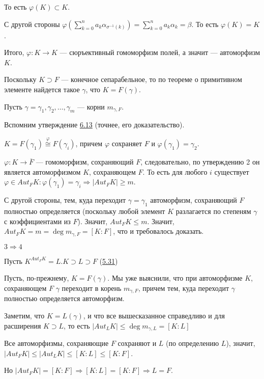\begin{solution}
То есть \(\varphi(K) \subset K\).

С другой стороны \(\varphi(\sum\limits_{k = 0}^n a_k \alpha_{\sigma^{-1}(k)}) = \sum\limits_{k = 0}^n a_k \alpha_k = \beta\). То есть \(\varphi(K) = K\).

Итого, \(\varphi:K \to K\) --- сюръективный гомоморфизм полей, а значит --- автоморфизм \(K\).

Поскольку \(K \supset F\) --- конечное сепарабельное, то по теореме о примитивном элементе найдется такое \(\gamma\), что \(K = F(\gamma)\).

Пусть \(\gamma = \gamma_1, \gamma_2, \ldots, \gamma_m\) --- корни \(m_{\gamma, F}\).

Вспомним утверждение \hyperlink{6.13}{6.13} (точнее, его доказательство).

\(K = F(\gamma_1) \stackrel{\varphi}{\cong} F(\gamma_i)\), причем \(\varphi\) сохраняет \(F\) и \(\varphi(\gamma_1) = \gamma_2\).

\(\varphi: K \to \overline{F}\) --- гомоморфизм, сохраняющий \(F\), следовательно, по утверждению 2 он является автоморфизмом \(K\), сохраняющем \(F\). То есть для любого \(i\) существует \(\varphi \in Aut_FK: \varphi(\gamma_1) = \gamma_i \Rightarrow |Aut_FK| \geqslant m\).

С другой стороны, тем, куда переходит \(\gamma = \gamma_1\) автоморфизм, сохраняющий \(F\) полностью определяется (поскольку любой элемент \(K\) разлагается по степеням \(\gamma\) с коэффициентами из \(F\)). Значит, \(Aut_FK \leqslant m\). Значит, \(Aut_FK = m = \deg m_{\gamma, F} = [K : F]\), что и требовалось доказать.

\(3 \Rightarrow 4\)

Пусть \(K^{Aut_FK} = L. K \supset L \supset F\) (\hyperlink{5.31}{5.31})

Пусть, по-прежнему, \(K = F(\gamma)\). Мы уже выяснили, что при автоморфизме \(K\), сохраняющем \(F\) \(\gamma\) переходит в корень \(m_{\gamma, F}\), причем тем, куда переходит \(\gamma\) полностью определяется автоморфизм.

Заметим, что \(K = L(\gamma)\), и что все вышесказанное справедливо и для расширения \(K \supset L\), то есть \(|Aut_LK| \leqslant \deg m_{\gamma, L} = [K : L]\)

Все автоморфизмы, сохраняющие \(F\) сохраняют и \(L\) (по определению \(L\)), значит, \(|Aut_FK| \leqslant |Aut_LK| \leqslant [K : L] \leqslant [K : F]\).

Но \(|Aut_FK| = [K : F] \Rightarrow [K : L] = [K : F] \Rightarrow L = F\).


\end{solution}
